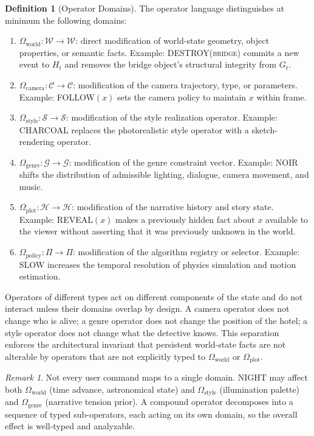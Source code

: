 \documentclass[11pt,a4paper]{article}
\theoremstyle{plain}
\theoremstyle{definition}
\newtheorem{definition}[theorem]{Definition}
\theoremstyle{remark}
\newtheorem{remark}[theorem]{Remark}
\begin{document}
\begin{definition}[Operator Domains]
The operator language distinguishes at minimum the following domains:
\begin{enumerate}[leftmargin=2em,itemsep=0pt]
\item $\Omega_{\mathrm{world}} : \mathcal{W} \to \mathcal{W}$: direct modification of world-state geometry, object properties, or semantic facts. Example: \textsc{DESTROY(bridge)} commits a new event to $H_t$ and removes the bridge object's structural integrity from $G_t$.
\item $\Omega_{\mathrm{camera}} : \mathcal{C} \to \mathcal{C}$: modification of the camera trajectory, type, or parameters. Example: \textsc{FOLLOW}$(x)$ sets the camera policy to maintain $x$ within frame.
\item $\Omega_{\mathrm{style}} : \mathcal{S} \to \mathcal{S}$: modification of the style realization operator. Example: \textsc{CHARCOAL} replaces the photorealistic style operator with a sketch-rendering operator.
\item $\Omega_{\mathrm{genre}} : \mathcal{G} \to \mathcal{G}$: modification of the genre constraint vector. Example: \textsc{NOIR} shifts the distribution of admissible lighting, dialogue, camera movement, and music.
\item $\Omega_{\mathrm{plot}} : \mathcal{H} \to \mathcal{H}$: modification of the narrative history and story state. Example: \textsc{REVEAL}$(x)$ makes a previously hidden fact about $x$ available to the viewer without asserting that it was previously unknown in the world.
\item $\Omega_{\mathrm{policy}} : \Pi \to \Pi$: modification of the algorithm registry or selector. Example: \textsc{SLOW} increases the temporal resolution of physics simulation and motion estimation.
\end{enumerate}
\end{definition}

Operators of different types act on different components of the state and do not interact unless their domains overlap by design. A camera operator does not change who is alive; a genre operator does not change the position of the hotel; a style operator does not change what the detective knows. This separation enforces the architectural invariant that persistent world-state facts are not alterable by operators that are not explicitly typed to $\Omega_{\mathrm{world}}$ or $\Omega_{\mathrm{plot}}$.

\begin{remark}
Not every user command maps to a single domain. \textsc{NIGHT} may affect both $\Omega_{\mathrm{world}}$ (time advance, astronomical state) and $\Omega_{\mathrm{style}}$ (illumination palette) and $\Omega_{\mathrm{genre}}$ (narrative tension prior). A compound operator decomposes into a sequence of typed sub-operators, each acting on its own domain, so the overall effect is well-typed and analyzable.
\end{remark}
\end{document}
